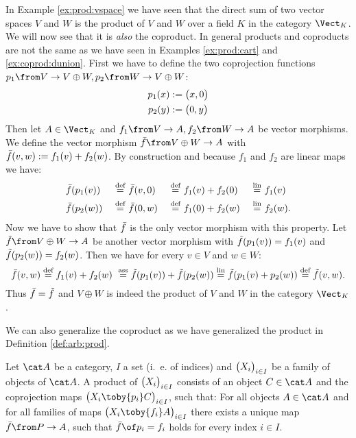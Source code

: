 \begin{example}
  \label{ex:coprod:vspace}
  In Example \ref{ex:prod:vspace} we have seen that the direct sum of two vector spaces $V$ and $W$ is the product of $V$ and $W$ over a field $K$ in the category $\Vect_K$.
  We will now see that it is \emph{also} the coproduct.
  In general products and coproducts are not the same as we have seen in Examples \ref{ex:prod:cart} and \ref{ex:coprod:dunion}.
  First we have to define the two coprojection functions $p_1 \from V \to V \oplus W, p_2 \from W \to V \oplus W$:
  \begin{alignat*}{2}
    p_1(x) &:= \bigl( x , 0 \bigr) \\
    p_2(y) &:= \bigl( 0 , y \bigr)
  \end{alignat*}
  Then let $A \in \Vect_K$ and $f_1 \from V \to A, f_2 \from W \to A$ be vector morphisms.
  We define the vector morphism $\fbar \from V \oplus W \to A$ with $\bar{f}(v, w) := f_1(v) + f_2(w)$.
  By construction and because $f_1$ and $f_2$ are linear maps we have:
  \begin{alignat*}{6}
    & \bar{f}(p_1(v)) ~&\stackrel{\text{def}}{=}&~ \bar{f}(v, 0) ~&\stackrel{\text{def}}{=}&~ f_1(v) + f_2(0) ~&\stackrel{\text{lin}}{=}&~ f_1(v) \\
    & \bar{f}(p_2(w)) ~&\stackrel{\text{def}}{=}&~ \bar{f}(0, w) ~&\stackrel{\text{def}}{=}&~ f_1(0) + f_2(w) ~&\stackrel{\text{lin}}{=}&~ f_2(w) .
  \end{alignat*}
  Now we have to show that $\bar{f}$ is the only vector morphism with this property.
  Let $\ftilde \from V \oplus W \to A$ be another vector morphism with $\tilde{f}(p_1(v)) = f_1(v)$ and $\tilde{f}(p_2(w)) = f_2(w)$.
  Then we have for every $v \in V$ and $w \in W$:
  $$\bar{f}(v,w) \stackrel{\text{def}}{=} f_1(v) + f_2(w)\ \stackrel{\text{ass}}{=} \tilde{f}(p_1(v)) + \tilde{f}(p_2(w)) \stackrel{\text{lin}}{=} \tilde{f}(p_1(v) + p_2(w)) \stackrel{\text{def}}{=} \tilde{f}(v, w).$$
  Thus $\bar{f} = \tilde{f}$ and $V \oplus W$ is indeed the product of $V$ and $W$ in the category $\Vect_K$.
\end{example}

We can also generalize the coproduct as we have generalized the product in Definition \ref{def:arb:prod}.

\begin{definition}
  \label{def:arb:coprod}
  Let $\catA$ be a category, $I$ a set (i.~e. of indices) and $\bigl( X_i \bigr)_{i \in I}$ be a family of objects of $\catA$.
  A product of $\bigl( X_i \bigr)_{i \in I}$ consists of an object $C \in \catA$ and the coprojection maps $\family{X_i \toby{p_i} C}{i \in I}$, such that:
  For all objects $A \in \catA$ and for all families of maps $\family{X_i \toby{f_i} A}{i \in I}$ there exists a unique map $\fbar \from P \to A$, such that $\fbar \of p_i = f_i$ holds for every index $i \in I$.
\end{definition}

